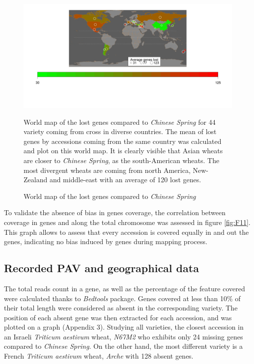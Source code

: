 \documentclass[a4paper, 12pt]{article}
\begin{document}
\begin{onehalfspace}
\begin{figure}
    \end{figure}
    \begin{figure}
    \vspace{-0.5cm}
      \centering \includegraphics[scale=0.28]{Figures/Figure_12.jpg}
      \vspace{-1.5cm}
      \caption{World map of the lost genes compared to \textit{Chinese Spring}} 
      \label{fig:F12}
   \footnotesize{World map of the lost genes compared to \textit{Chinese Spring} for 44 variety coming from cross in diverse countries. The mean of lost genes by accessions coming from the same country was calculated and plot on this world map. It is clearly visible that Asian wheats are closer to \textit{Chinese Spring}, as the south-American wheats. The most divergent wheats are coming from north America, New-Zealand and middle-east with an average of 120 lost genes.}
    \end{figure}
\addtocounter{page}{-1}
\newpage
\clearpage 

To validate the absence of bias in genes coverage, the correlation between coverage in genes and along the total chromosome was assessed in figure \ref{fig:F11}. This graph allows to assess that every accession is covered equally in and out the genes, indicating no bias induced by genes during mapping process.

        \subsection{Recorded PAV and geographical data}

The total reads count in a gene, as well as the percentage of the feature covered were calculated thanks to \textit{Bedtools} package. Genes covered at less than 10\% of their total length were considered as absent in the corresponding variety. The position of each absent gene was then extracted for each accession, and was plotted on a graph (Appendix 3). Studying all varieties, the closest accession in an Israeli \textit{Triticum aestivum} wheat, \textit{N67M2} who exhibits only 24 missing genes compared to \textit{Chinese Spring}. On the other hand, the most different variety is a French \textit{Triticum aestivum} wheat, \textit{Arche} with 128 absent genes.


\end{onehalfspace}
\end{document}
